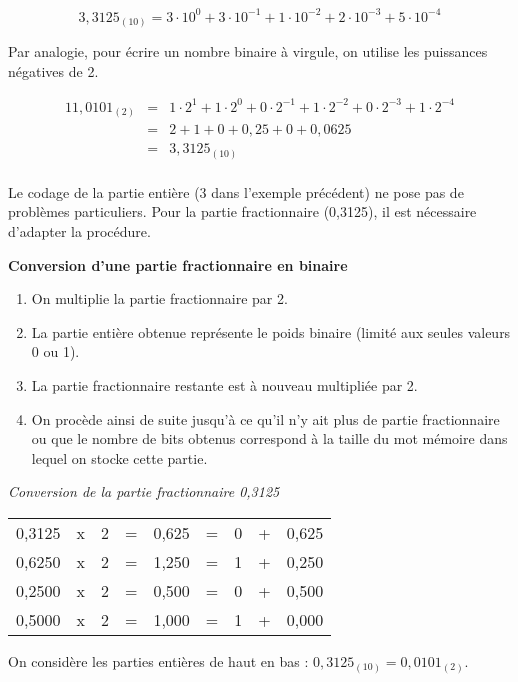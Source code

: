 \begin{exemple}
$$
3,3125_{ (10)}	=	3\cdot 10^0 + 3\cdot10^{- 1} + 1\cdot10^{- 2} + 2\cdot10^{ -3} + 5\cdot10^{ -4}
$$
\end{exemple}

Par analogie, pour écrire un nombre binaire à virgule, on utilise les puissances négatives de 2.

\begin{exemple}
\begin{eqnarray*}
11,0101_{(2)} &=&	1\cdot 2^{1} + 1\cdot 2^{0} + 0\cdot 2^{-1} + 1\cdot 2^{- 2} + 0\cdot 2^{-3} + 1\cdot 2^{- 4}\\
		 &=&    2   +   1   +    0    +   0,25  +     0     +   0,0625\\
		 &=&   3,3125_{(10)}\\
\end{eqnarray*}
\vspace{-1cm}
\end{exemple}


Le codage de la partie entière (3 dans l’exemple précédent) ne pose pas de problèmes particuliers. Pour la partie fractionnaire (0,3125), il est nécessaire d’adapter la procédure.

\begin{methode}
\textbf{Conversion d'une partie fractionnaire en binaire}

\begin{enumerate}
\item On multiplie la partie fractionnaire par 2. 
\item La partie entière obtenue représente le poids binaire (limité aux seules valeurs 0 ou 1). 
\item La partie fractionnaire restante est à nouveau multipliée par 2.
\item On procède ainsi de suite jusqu’à ce qu’il n’y ait plus de partie fractionnaire ou que le nombre de bits obtenus correspond à la taille du mot mémoire dans lequel on stocke cette partie.
\end{enumerate}
\end{methode}


\begin{exemple}
\textit{Conversion de la partie fractionnaire 0,3125}

\begin{center}
\begin{tabular}{cccccc|c|cc}
\cline{7-7}
0,3125 & x & 2 & = & 0,625 & = & 0 & + & 0,625 \\
0,6250 & x & 2 & = & 1,250 & = & 1 & + & 0,250 \\
0,2500 & x & 2 & = & 0,500 & = & 0 & + & 0,500 \\
0,5000 & x & 2 & = & 1,000 & = & 1 & + & 0,000 \\
\cline{7-7}
\end{tabular}
\end{center}
On considère les parties entières de haut en bas :
$0,3125_{(10)}=0,0101_{(2)}$.
\end{exemple}

